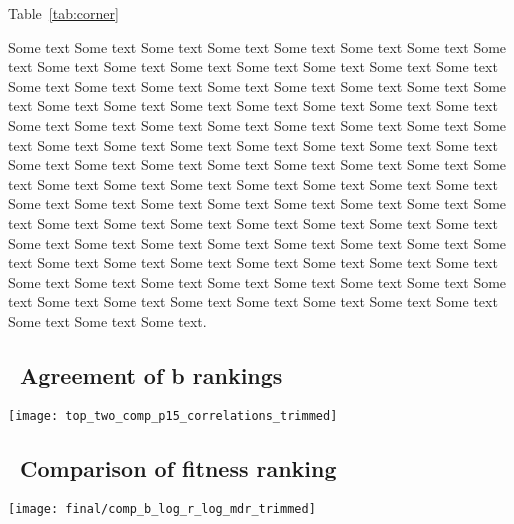 \begin{multicols}{2}
Table~\ref{tab:corner}

  Some text Some text Some text Some text Some text Some text Some
  text Some text Some text Some text Some text Some text Some text
  Some text Some text Some text Some text Some text Some text Some
  text Some text Some text Some text Some text Some text Some text
  Some text Some text Some text Some text Some text Some text Some
  text Some text Some text Some text Some text Some text Some text
  Some text Some text Some text Some text Some text Some text Some
  text Some text Some text Some text Some text Some text Some text
  Some text Some text Some text Some text Some text Some text Some
  text Some text Some text Some text Some text Some text Some text
  Some text Some text Some text Some text Some text Some text Some
  text Some text Some text Some text Some text Some text Some text
  Some text Some text Some text Some text Some text Some text Some
  text Some text Some text Some text Some text Some text Some text
  Some text Some text Some text Some text Some text Some text Some
  text Some text Some text Some text Some text Some text Some text
  Some text Some text Some text Some text.

\subsection{\thesubsection~Agreement of b rankings}

\graphicspath{{images/rank/}}
\begin{Figure}
  \centering
  \texttt{[image: top\_two\_comp\_p15\_correlations\_trimmed]}
  \label{fig:comp_b_ranking}
\end{Figure}

\subsection{\thesubsection~Comparison of fitness ranking}

\graphicspath{{images/rank/}}
\begin{Figure}
  \centering
  \texttt{[image: final/comp\_b\_log\_r\_log\_mdr\_trimmed]}
  \label{fig:comp_vs_log_ranking}
\end{Figure}



\end{multicols}
